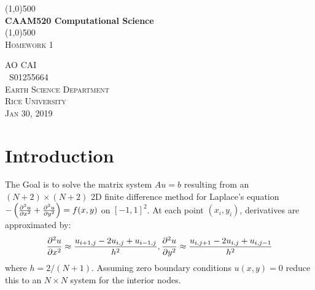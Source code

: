 \documentclass[12pt]{article}
\begin{document}

\begin{titlepage}
	\begin{center}
	\line(1,0){500}\\
	[0.25in]
	\huge{\bfseries CAAM520 Computational Science}\\
	[2mm]
	\line(1,0){500}\\
	[1.5cm]
	\textsc{\LARGE Homework 1}\\
	[8cm] 
	\end{center}
	\begin{flushright}
	\textsc{\large AO CAI \\
	\ S01255664\\
	Earth Science Department\\
	Rice University\\
	Jan 30, 2019\\}
	\end{flushright}

\end{titlepage}


\tableofcontents
\thispagestyle{empty}
\cleardoublepage

\setcounter{page}{1}

\section{Introduction}\label{sec:intro}
The Goal is to solve the matrix system {\bfseries$Au=b$} resulting from an $(N+2)\times(N+2)$ 2D finite difference method for Laplace's equation $-\left(\pdv[2]{u}{x} + \pdv[2]{u}{y} \right) = f(x,y)$ on $[-1,1]^2$. At each point $(x_i,y_i)$, derivatives are approximated by:
$$\pdv[2]{u}{x} \approx \frac{u_{i+1,j}-2u_{i,j}+u_{i-1,j}}{h^2}, \pdv[2]{u}{y} \approx \frac{u_{i,j+1}-2u_{i,j}+u_{i,j-1}}{h^2}$$
where $h = 2/(N+1)$. Assuming zero boundary conditions $u(x,y) = 0$ reduce this to an $N \times N$ system for the interior nodes.
\end{document}
